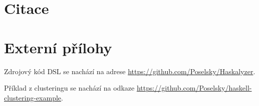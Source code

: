\documentclass[male,czech]{kithesis}
\begin{document}
\chapter{Citace}


\printbibliography[heading=none]
\appendix


\chapter{Externí přílohy}

Zdrojový kód DSL se nachází na adrese \href{https://github.com/Poselsky/Haskalyzer}{https://github.com/Poselsky/Haskalyzer}.

Příklad z clusteringu se nachází na odkaze \href{https://github.com/Poselsky/haskell-clustering-example}{https://github.com/Poselsky/haskell-clustering-example}.
\end{document}

